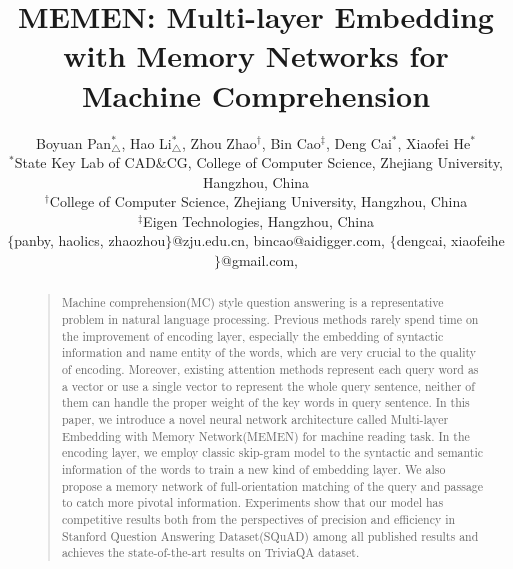 \documentclass[letterpaper]{article}
\begin{document}
%
\title{MEMEN: Multi-layer Embedding with Memory Networks for Machine Comprehension}

\author{Boyuan Pan$^*_{\bigtriangleup}$, Hao Li$^*_{\bigtriangleup}$, Zhou Zhao$^\dag$, Bin Cao$^\ddagger$, Deng Cai$^*$, Xiaofei He$^*$\\
	$^*$State Key Lab of CAD$\&$CG, College of Computer Science, Zhejiang University, Hangzhou, China\\
	$^\dag$College of Computer Science, Zhejiang University, Hangzhou, China\\
	$^\ddagger$Eigen Technologies, Hangzhou, China\\
	$\{$panby, haolics, zhaozhou$\}$@zju.edu.cn, bincao@aidigger.com, $\{$dengcai, xiaofeihe$\}$@gmail.com,  \\
}

\maketitle

\begin{abstract}
\begin{quote}
Machine comprehension(MC) style question answering is a representative problem in natural language processing. Previous methods rarely spend time on the improvement of encoding layer, especially the embedding of syntactic information and name entity of the words, which are very crucial to the quality of encoding. Moreover, existing attention methods represent each query word as a vector or use a single vector to represent the whole query sentence, neither of them can handle the proper weight of the key words in query sentence. In this paper, we introduce a novel neural network architecture called Multi-layer Embedding with Memory Network(MEMEN) for machine reading task. In the encoding layer, we employ classic skip-gram model to the syntactic and semantic information of the words to train a new kind of embedding layer. We also propose a memory network of full-orientation matching of the query and passage to catch more pivotal information. Experiments show that our model has competitive results both from the perspectives of precision and efficiency in Stanford Question Answering Dataset(SQuAD) among all published results and achieves the state-of-the-art results on TriviaQA dataset.


\end{quote}
\end{abstract}
\end{document}
